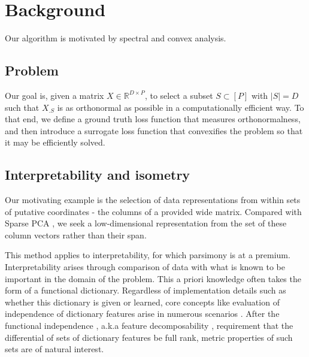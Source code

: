 \section{Background}

Our algorithm is motivated by spectral and convex analysis.

\subsection{Problem}

Our goal is, given a matrix $ X \in \mathbb R^{D \times P}$, to select a subset $ S \subset [P]$ with $| S| = D$ such that $X_{.  S}$ is as orthonormal as possible in a computationally efficient way.
To that end, we define a ground truth loss function that measures orthonormalness, and then introduce a surrogate loss function that convexifies the problem so that it may be efficiently solved.

\subsection{Interpretability and isometry}

Our motivating example is the selection of data representations from within sets of putative coordinates - the columns of a provided wide matrix.
Compared with Sparse PCA \citep{Dey2017-mx, Bertsimas2022-qo, Bertsimas2022-dv}, we seek a low-dimensional representation from the set of these column vectors rather than their span.

This method applies to interpretability, for which parsimony is at a premium.
Interpretability arises through comparison of data with what is known to be important in the domain of the problem.
This a priori knowledge often takes the form of a functional dictionary.
Regardless of implementation details such as whether this dictionary is given or learned, core concepts like evaluation of independence of dictionary features arise in numerous scenarios \citep{Chen2019-km, Koelle2022-ju, He2023-ch}.
After the functional independence \citep{Koelle2022-ju}, a.k.a feature decomposability \citep{templeton2024scaling}, requirement that the differential of sets of dictionary features be full rank, metric properties of such sets are of natural interest.

